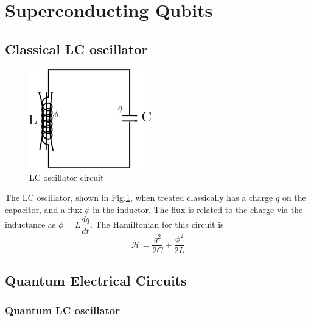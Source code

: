 \section{Superconducting Qubits}

\subsection{Classical LC oscillator}

\begin{figure}
\centering
\includegraphics[width=150pt]{Figures/LC_oscillator}
\decoRule
\caption[LC oscillator]{LC oscillator circuit}
\label{fig:LC oscillator}
\end{figure}

The LC oscillator, shown in Fig.\ref{fig:LC oscillator}, when treated classically has a charge $q$ on the capacitor, and a flux $\phi$ in the inductor. The flux is related to the charge via the inductance as $\phi=L\dfrac{dq}{dt}$. The Hamiltonian for this circuit is
\begin{equation}
\mathcal{H}=\frac{q^2}{2C}+\frac{\phi^2}{2L}
\end{equation}

\subsection{Quantum Electrical Circuits}

\subsubsection{Quantum LC oscillator}


